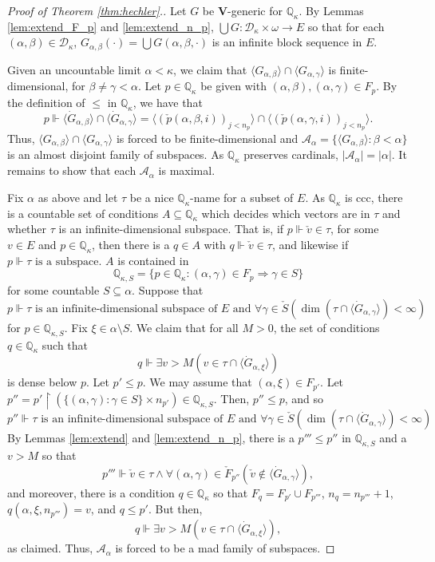 \documentclass[11pt]{amsart}
\newcommand{\restr}{\upharpoonright}
\newcommand{\forces}{\mathrel{\Vdash}}
\newcommand{\Q}{\mathbb{Q}}
\newcommand{\LA}{\mathcal{A}}
\newcommand{\LD}{\mathcal{D}}
\theoremstyle{definition}
\theoremstyle{remark}
\renewcommand{\1}{\mathbf{1}}
\newcommand{\V}{\mathbf{V}}
\begin{document}
\begin{proof}[Proof of Theorem \ref{thm:hechler}.]
	Let $G$ be $\V$-generic for $\Q_\kappa$. By Lemmas \ref{lem:extend_F_p} and \ref{lem:extend_n_p}, $\bigcup G:\LD_\kappa\times\omega\to E$ so that for each $(\alpha,\beta)\in\LD_\kappa$, $G_{\alpha,\beta}(\cdot)=\bigcup G(\alpha,\beta,\cdot)$ is an infinite block sequence in $E$.

	Given an uncountable limit $\alpha<\kappa$, we claim that $\langle G_{\alpha,\beta}\rangle\cap\langle G_{\alpha,\gamma}\rangle$ is finite-dimensional, for $\beta\neq\gamma<\alpha$. Let $p\in\Q_\kappa$ be given with $(\alpha,\beta),(\alpha,\gamma)\in F_p$. By the definition of $\leq$ in $\Q_\kappa$, we have that
	\[
		p\forces\langle \dot{G}_{\alpha,\beta}\rangle\cap\langle \dot{G}_{\alpha,\gamma}\rangle=\langle(\check{p}(\alpha,\beta,i))_{j<n_p}\rangle\cap\langle(\check{p}(\alpha,\gamma,i))_{j<n_p}\rangle.
	\]
	Thus, $\langle G_{\alpha,\beta}\rangle\cap\langle G_{\alpha,\gamma}\rangle$ is forced to be finite-dimensional and $\LA_\alpha=\{\langle G_{\alpha,\beta}\rangle:\beta<\alpha\}$ is an almost disjoint family of subspaces. As $\Q_\kappa$ preserves cardinals, $|\LA_\alpha|=|\alpha|$. It remains to show that each $\LA_\alpha$ is maximal.
	
	Fix $\alpha$ as above and let $\tau$ be a nice $\Q_\kappa$-name for a subset of $E$. As $\Q_\kappa$ is ccc, there is a countable set of conditions $A\subseteq\Q_\kappa$ which decides which vectors are in $\tau$ and whether $\tau$ is an infinite-dimensional subspace. That is, if $p\forces\check{v}\in\tau$, for some $v\in E$ and $p\in\Q_\kappa$, then there is a $q\in A$ with $q\forces\check{v}\in\tau$, and likewise if $p\forces\tau\text{ is a subspace}$. $A$ is contained in
	\[
		\Q_{\kappa,S} = \{p\in\Q_\kappa:(\alpha,\gamma)\in F_p\Rightarrow\gamma\in S\}
	\]
	for some countable $S\subseteq\alpha$. Suppose that
	\[
		p\forces \text{$\tau$ is an infinite-dimensional subspace of $E$ and $\forall\gamma\in\check{S}(\dim(\tau\cap \langle \dot{G}_{\alpha,\gamma}\rangle)<\infty)$}
	\]
	for $p\in\Q_{\kappa,S}$. Fix $\xi\in\alpha\setminus S$. We claim that for all $M>0$, the set of conditions $q\in\Q_\kappa$ such that
	\[
		q\forces\exists v>M(v\in\tau\cap\langle \dot{G}_{\alpha,\xi}\rangle)
	\]
	is dense below $p$. Let $p'\leq p$. We may assume that $(\alpha,\xi)\in F_{p'}$. Let $p''=p'\restr(\{(\alpha,\gamma):\gamma\in S\}\times n_{p'})\in\Q_{\kappa,S}$. Then, $p''\leq p$, and so
	\[
		p''\forces \text{$\tau$ is an infinite-dimensional subspace of $E$ and $\forall\gamma\in\check{S}(\dim(\tau\cap \langle \dot{G}_{\alpha,\gamma}\rangle)<\infty)$}
	\]
	By Lemmas \ref{lem:extend} and \ref{lem:extend_n_p}, there is a $p'''\leq p''$ in $\Q_{\kappa,S}$ and a $v>M$ so that
	\[
		p'''\forces \check{v}\in\tau\land \forall (\alpha,\gamma)\in \check{F}_{p''}(\check{v}\notin\langle \dot{G}_{\alpha,\gamma}\rangle),
	\]
	and moreover, there is a condition $q\in\Q_\kappa$ so that $F_q=F_{p'}\cup F_{p'''}$, $n_q=n_{p'''}+1$, $q(\alpha,\xi,n_{p'''})=v$, and $q\leq p'$. But then,
	\[
		q\forces\exists v>M(v\in\tau\cap\langle \dot{G}_{\alpha,\xi}\rangle),
	\]
	as claimed. Thus, $\LA_\alpha$ is forced to be a mad family of subspaces.
	

\end{proof}
\end{document}
